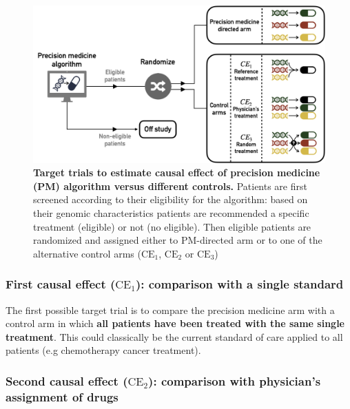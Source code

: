 \documentclass[a4paper,12pt,twoside,onecolumn,openright,final,oldfontcommands]{memoir}
\begin{document}
\begin{figure}

{\centering \includegraphics[width=0.9\linewidth]{fig/target-trials} 

}

\caption[Target trials to estimate causal effect of precision medicine (PM) algorithm versus different controls]{\textbf{Target trials to estimate causal
effect of precision medicine (PM) algorithm versus different controls.}
Patients are first screened according to their eligibility for the
algorithm: based on their genomic characteristics patients are
recommended a specific treatment (eligible) or not (no eligible). Then
eligible patients are randomized and assigned either to PM-directed arm
or to one of the alternative control arms (\(\text{CE}_1\),
\(\text{CE}_2\) or \(\text{CE}_3\))}\label{fig:target-trials}
\end{figure}










\subsubsection{\texorpdfstring{First causal effect (\(\text{CE}_1\)):
comparison with a single
standard}{First causal effect (\textbackslash{}text\{CE\}\_1): comparison with a single standard}}\label{first-causal-effect-textce_1-comparison-with-a-single-standard}

The first possible target trial is to compare the precision medicine arm
with a control arm in which \textbf{all patients have been treated with
the same single treatment}. This could classically be the current
standard of care applied to all patients (e.g chemotherapy cancer
treatment).

\subsubsection{\texorpdfstring{Second causal effect (\(\text{CE}_2\)):
comparison with physician's assignment of
drugs}{Second causal effect (\textbackslash{}text\{CE\}\_2): comparison with physician's assignment of drugs}}\label{second-causal-effect-textce_2-comparison-with-physicians-assignment-of-drugs}
\end{document}
